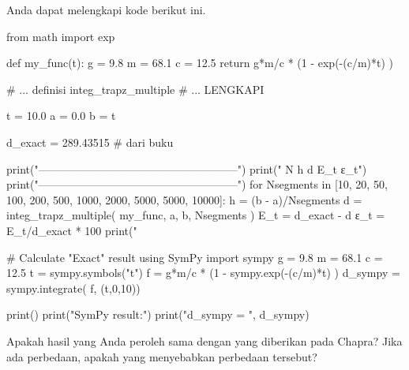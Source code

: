 Anda dapat melengkapi kode berikut ini.
\begin{pythoncode}
from math import exp

def my_func(t):
    g = 9.8
    m = 68.1
    c = 12.5
    return g*m/c * (1 - exp(-(c/m)*t) )
    
# ... definisi integ_trapz_multiple
# ... LENGKAPI

t = 10.0
a = 0.0
b = t
    
d_exact = 289.43515 # dari buku
    
print("------------------------------------------------------")
print("   N          h          d          E_t         ε_t")
print("------------------------------------------------------")
for Nsegments in [10, 20, 50, 100, 200, 500, 1000, 2000, 5000, 5000, 10000]:
    h = (b - a)/Nsegments
    d = integ_trapz_multiple( my_func, a, b, Nsegments )
    E_t = d_exact - d
    ε_t = E_t/d_exact * 100
    print("%


# Calculate "Exact" result using SymPy
import sympy
g = 9.8
m = 68.1
c = 12.5
t = sympy.symbols("t")
f = g*m/c * (1 - sympy.exp(-(c/m)*t) )
d_sympy = sympy.integrate( f, (t,0,10))
    
print()
print("SymPy result:")
print("d_sympy = ", d_sympy)    
\end{pythoncode}

Apakah hasil yang Anda peroleh sama dengan yang diberikan pada Chapra?
Jika ada perbedaan, apakah yang menyebabkan perbedaan tersebut?